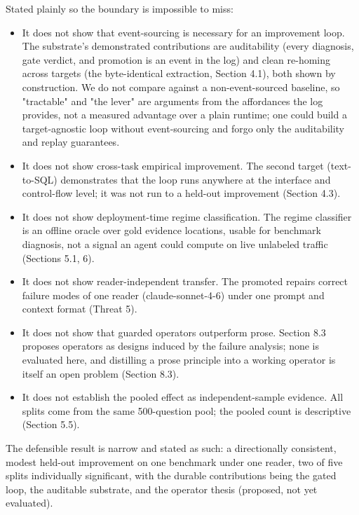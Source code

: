 \begin{tcolorbox}[colback=gray!5,colframe=gray!50!black,title=\textbf{What this paper does not show},breakable]
Stated plainly so the boundary is impossible to miss:
\begin{itemize}
\item It does not show that event-sourcing is necessary for an improvement loop. The substrate's demonstrated contributions are auditability (every diagnosis, gate verdict, and promotion is an event in the log) and clean re-homing across targets (the byte-identical extraction, Section 4.1), both shown by construction. We do not compare against a non-event-sourced baseline, so "tractable" and "the lever" are arguments from the affordances the log provides, not a measured advantage over a plain runtime; one could build a target-agnostic loop without event-sourcing and forgo only the auditability and replay guarantees.
\item It does not show cross-task empirical improvement. The second target (text-to-SQL) demonstrates that the loop runs anywhere at the interface and control-flow level; it was not run to a held-out improvement (Section 4.3).
\item It does not show deployment-time regime classification. The regime classifier is an offline oracle over gold evidence locations, usable for benchmark diagnosis, not a signal an agent could compute on live unlabeled traffic (Sections 5.1, 6).
\item It does not show reader-independent transfer. The promoted repairs correct failure modes of one reader (claude-sonnet-4-6) under one prompt and context format (Threat 5).
\item It does not show that guarded operators outperform prose. Section 8.3 proposes operators as designs induced by the failure analysis; none is evaluated here, and distilling a prose principle into a working operator is itself an open problem (Section 8.3).
\item It does not establish the pooled effect as independent-sample evidence. All splits come from the same 500-question pool; the pooled count is descriptive (Section 5.5).
\end{itemize}
\end{tcolorbox}

The defensible result is narrow and stated as such: a directionally consistent, modest held-out improvement on one benchmark under one reader, two of five splits individually significant, with the durable contributions being the gated loop, the auditable substrate, and the operator thesis (proposed, not yet evaluated).


